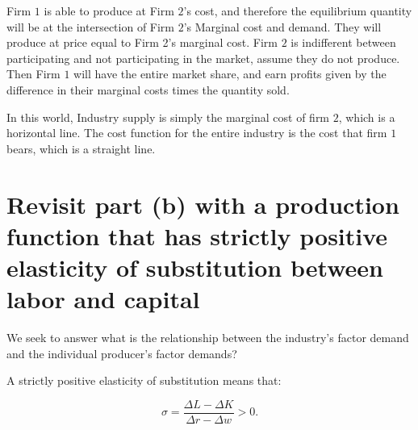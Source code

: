 \documentclass[12pt]{paper}
\begin{document}

Firm $1$ is able to produce at Firm $2$'s cost, and therefore the
equilibrium quantity will be at the intersection of Firm $2$'s
Marginal cost and demand. They will produce at price equal to Firm 2's
marginal cost. Firm $2$ is indifferent between participating and not
participating in the market, assume they do not produce. Then Firm $1$
will have the entire market share, and earn profits given by the
difference in their marginal costs times the quantity sold.

In this world, Industry supply is simply the marginal cost of firm
$2$, which is a horizontal line. The cost function for the entire
industry is the cost that firm $1$ bears, which is a straight line.

\section{Revisit part (b) with a production function that has strictly
  positive elasticity of substitution between labor and capital}

We seek to answer what is the relationship between the industry's
factor demand and the individual producer's factor demands?

A strictly positive elasticity of substitution means that:

\begin{equation*}
  \sigma = \frac{\Delta L - \Delta K}{\Delta r - \Delta w} > 0.
\end{equation*}
\end{document}
